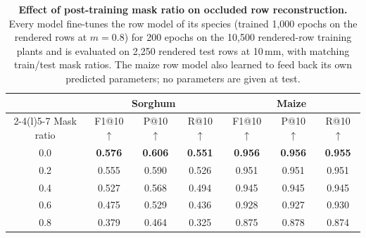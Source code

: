 \documentclass[10pt,twocolumn,letterpaper]{article}
\begin{document}
\begin{table}[t]
  \caption{\textbf{Effect of post-training mask ratio on occluded row reconstruction.} Every model fine-tunes the row
  model of its species (trained 1{,}000 epochs on the rendered rows at $m=0.8$) for 200 epochs on the 10{,}500
  rendered-row training plants and is evaluated on 2{,}250 rendered test rows at 10\,mm, with matching train/test mask
  ratios. The maize row model also learned to feed back its own predicted parameters; no parameters are given at test.}
  \label{tab:abl_mask}
  \centering\footnotesize
  \setlength{\tabcolsep}{2.5pt}
  \begin{tabular}{@{}ccccccc@{}}
    \toprule
    & \multicolumn{3}{c}{Sorghum} & \multicolumn{3}{c}{Maize} \\
    \cmidrule(lr){2-4}\cmidrule(l){5-7}
    Mask ratio & F1@10 $\uparrow$ & P@10 $\uparrow$ & R@10 $\uparrow$ & F1@10 $\uparrow$ & P@10 $\uparrow$ & R@10 $\uparrow$ \\
    \midrule
    0.0 & \textbf{0.576} & \textbf{0.606} & \textbf{0.551} & \textbf{0.956} & \textbf{0.956} & \textbf{0.955} \\
    0.2 & 0.555 & 0.590 & 0.526 & 0.951 & 0.951 & 0.951 \\
    0.4 & 0.527 & 0.568 & 0.494 & 0.945 & 0.945 & 0.945 \\
    0.6 & 0.475 & 0.529 & 0.436 & 0.928 & 0.927 & 0.930 \\
    0.8 & 0.379 & 0.464 & 0.325 & 0.875 & 0.878 & 0.874 \\
    \bottomrule
  \end{tabular}
\end{table}
\end{document}
